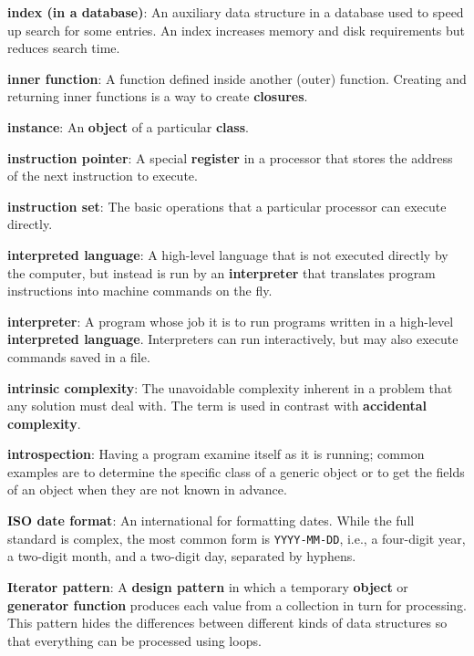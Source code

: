 \documentclass[krantzl]{krantz}
\newcommand{\glosskey}[1]{\textbf{#1}}
\begin{document}
\noindent \textbf{\glosskey{index (in a database)}}: 
An auxiliary data structure in a database used to speed up search for some entries. An index increases memory and disk requirements but reduces search time.


\noindent \textbf{\glosskey{inner function}}: 
A function defined inside another (outer) function.  Creating and returning inner functions is a way to create \glosskey{closures}.


\noindent \textbf{\glosskey{instance}}: 
An \glosskey{object} of a particular \glosskey{class}.


\noindent \textbf{\glosskey{instruction pointer}}: 
A special \glosskey{register} in a processor that stores the address of the next instruction to execute.


\noindent \textbf{\glosskey{instruction set}}: 
The basic operations that a particular processor can execute directly.


\noindent \textbf{\glosskey{interpreted language}}: 
A high-level language that is not executed directly by the computer, but instead is run by an \glosskey{interpreter} that translates program instructions into machine commands on the fly.


\noindent \textbf{\glosskey{interpreter}}: 
A program whose job it is to run programs written in a high-level \glosskey{interpreted language}. Interpreters can run interactively, but may also execute commands saved in a file.


\noindent \textbf{\glosskey{intrinsic complexity}}: 
The unavoidable complexity inherent in a problem that any solution must deal with. The term is used in contrast with \glosskey{accidental complexity}.


\noindent \textbf{\glosskey{introspection}}: 
Having a program examine itself as it is running; common examples are to determine the specific class of a generic object or to get the fields of an object when they are not known in advance.


\noindent \textbf{\glosskey{ISO date format}}: 
An international for formatting dates. While the full standard is complex, the most common form is \texttt{YYYY-MM-DD}, i.e., a four-digit year, a two-digit month, and a two-digit day, separated by hyphens.


\noindent \textbf{\glosskey{Iterator pattern}}: 
A \glosskey{design pattern} in which a temporary \glosskey{object} or \glosskey{generator function} produces each value from a collection in turn for processing. This pattern hides the differences between different kinds of data structures so that everything can be processed using loops.
\end{document}
